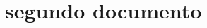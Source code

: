 \documentclass[assd_tp3_main.tex]{subfiles}
\begin{document}
\section{segundo documento}
\end{document}
